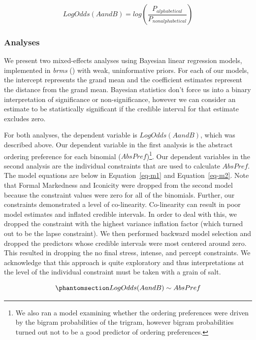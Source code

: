 \documentclass[
  nottoc]{article}
\begin{document}
\[
LogOdds(AandB) = log(\frac{P_{alphabetical}}{P_{nonalphabetical}})
\]

\subsubsection{Analyses}\label{analyses}

We present two mixed-effects analyses using Bayesian linear regression
models, implemented in \emph{brms} ()
with weak, uninformative priors. For each of our models, the intercept
represents the grand mean and the coefficient estimates represent the
distance from the grand mean. Bayesian statistics don't force us into a
binary interpretation of significance or non-significance, however we
can consider an estimate to be statistically significant if the credible
interval for that estimate excludes zero.

For both analyses, the dependent variable is \(LogOdds(AandB)\), which
was described above. Our dependent variable in the first analysis is the
abstract ordering preference for each binomial (\(AbsPref\))\footnote{We
  also ran a model examining whether the ordering preferences were
  driven by the bigram probabilities of the trigram, however bigram
  probabilities turned out not to be a good predictor of ordering
  preferences.}. Our dependent variables in the second analysis are the
individual constraints that are used to calculate \(AbsPref\). The model
equations are below in Equation~\ref{eq-m1} and Equation~\ref{eq-m2}.
Note that Formal Markedness and Iconicity were dropped from the second
model because the constraint values were zero for all of the binomials.
Further, our constraints demonstrated a level of co-linearity.
Co-linearity can result in poor model estimates and inflated credible
intervals. In order to deal with this, we dropped the constraint with
the highest variance inflation factor (which turned out to be the lapse
constraint). We then performed backward model selection and dropped the
predictors whose credible intervals were most centered around zero. This
resulted in dropping the no final stress, intense, and percept
constraints. We acknowledge that this approach is quite exploratory and
thus interpretations at the level of the individual constraint must be
taken with a grain of salt.

\begin{equation}\phantomsection\label{eq-m1}{
LogOdds(AandB) \sim AbsPref
}\end{equation}
\end{document}

